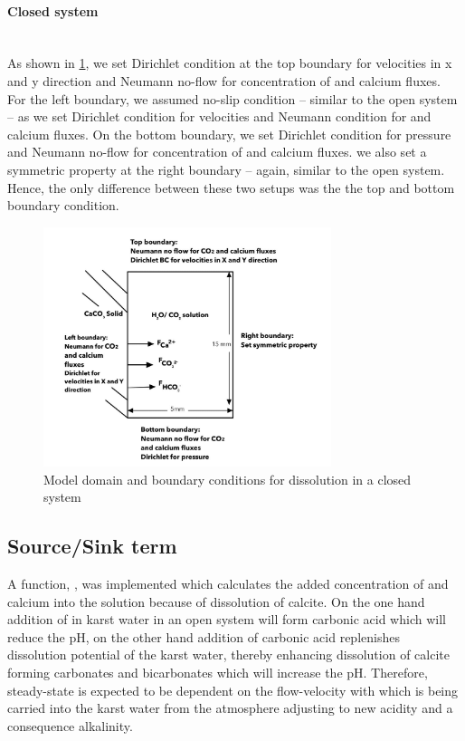 \paragraph*{Closed system} \mbox{} \\
As shown in \cref{fig:ClosedSystem}, we set Dirichlet condition at the top boundary for velocities in x and y direction and Neumann no-flow for concentration of  and calcium fluxes. For the left boundary, we assumed no-slip condition -- similar to the open system -- as we set Dirichlet condition for velocities and Neumann condition for  and calcium fluxes. On the bottom boundary, we set Dirichlet condition for pressure and Neumann no-flow for concentration of  and calcium fluxes. we also set a symmetric property at the right boundary -- again, similar to the open system. Hence, the only difference between these two setups was the the top and bottom boundary condition. 

\begin{figure}
    \centering
    \includegraphics[width=0.75\textwidth]{PICTURES/closed_system.jpg}
    \caption{Model domain and boundary conditions for  dissolution in a closed system}
    \label{fig:ClosedSystem}       %
\end{figure}
 

\subsection*{Source/Sink term} A function, , was implemented which calculates the added concentration of  and calcium into the solution because of dissolution of calcite. On the one hand addition of  in karst water in an open system  will form carbonic acid which will reduce the pH, on the other hand addition of carbonic acid replenishes dissolution potential of the karst water, thereby enhancing dissolution of calcite forming carbonates and bicarbonates which will increase the pH. Therefore, steady-state is expected to be dependent on the flow-velocity with which  is being carried into the karst water from the atmosphere adjusting to new acidity and a consequence alkalinity.

